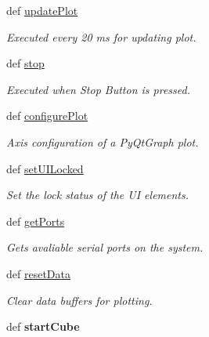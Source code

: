 \begin{DoxyCompactItemize}
\item 
def \hyperlink{classmain_1_1_main_window_a758087e2cfebe24205f39e60d7b66840}{update\-Plot}
\begin{DoxyCompactList}\small\item\em Executed every 20 ms for updating plot. \end{DoxyCompactList}\item 
def \hyperlink{classmain_1_1_main_window_a15ec36789cc84d0227b1b6f680ed7b9b}{stop}
\begin{DoxyCompactList}\small\item\em Executed when Stop Button is pressed. \end{DoxyCompactList}\item 
def \hyperlink{classmain_1_1_main_window_a0f04f1f65afb676ff40644e3479ed429}{configure\-Plot}
\begin{DoxyCompactList}\small\item\em Axis configuration of a Py\-Qt\-Graph plot. \end{DoxyCompactList}\item 
def \hyperlink{classmain_1_1_main_window_a043c23015ff1c2e15228020289d2084b}{set\-U\-I\-Locked}
\begin{DoxyCompactList}\small\item\em Set the lock status of the U\-I elements. \end{DoxyCompactList}\item 
def \hyperlink{classmain_1_1_main_window_a3b91003f1660c283ae5061f3f228a7e2}{get\-Ports}
\begin{DoxyCompactList}\small\item\em Gets avaliable serial ports on the system. \end{DoxyCompactList}\item 
def \hyperlink{classmain_1_1_main_window_a6133369df2df9755fa172a60efc7239f}{reset\-Data}
\begin{DoxyCompactList}\small\item\em Clear data buffers for plotting. \end{DoxyCompactList}\item 
\hypertarget{classmain_1_1_main_window_aadf0b01331836efbc9cb5170f0f11085}{def {\bfseries start\-Cube}}\label{classmain_1_1_main_window_aadf0b01331836efbc9cb5170f0f11085}

\end{DoxyCompactItemize}
